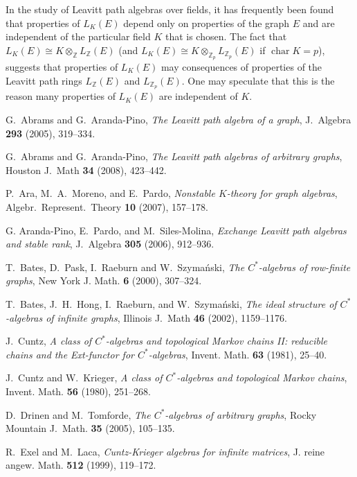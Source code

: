 \documentclass[11pt]{amsart}
\theoremstyle{remark}
\numberwithin{equation}{section}
\newcommand{\Z}{\mathbb{Z}}
\newcommand{\ch}{\operatorname{char}}
\begin{document}
In the study of Leavitt path algebras over fields, it has frequently been found that properties of $L_K(E)$ depend only on properties of the graph $E$ and are independent of the particular field $K$ that is chosen.  The fact that $L_K(E) \cong K \otimes_\Z L_\Z(E)$ (and $L_K(E) \cong K \otimes_{\Z_p} L_{\Z_p} (E)$ if $\ch K = p$), suggests that properties of $L_K(E)$ may consequences of properties of the Leavitt path rings $L_\Z(E)$ and $L_{\Z_p}(E)$.  One may speculate that this is the reason many properties of $L_K(E)$ are independent of $K$.


\begin{thebibliography}{99}

G.~Abrams and G.~Aranda-Pino, \emph{The Leavitt path algebra of a graph}, J.~Algebra \textbf{293} (2005), 319--334.

G.~Abrams and G.~Aranda-Pino, \emph{The Leavitt path algebras of arbitrary graphs}, Houston J.~Math \textbf{34} (2008), 423--442.

P.~Ara, M.~A.~Moreno, and E.~Pardo, \emph{Nonstable $K$-theory for graph algebras}, Algebr.~Represent.~Theory \textbf{10} (2007), 157--178. 

G. Aranda-Pino, E.~Pardo, and M.~Siles-Molina, \emph{Exchange Leavitt path algebras and stable rank}, J.~Algebra \textbf{305} (2006), 912--936.

T.~Bates, D.~Pask, I.~Raeburn and W.~Szyma\'nski,
\emph{The $C^*$-algebras of row-finite graphs}, New York J.
Math. \textbf{6} (2000), 307--324.

T.~Bates, J.~H.~Hong, I.~Raeburn, and W.~Szyma\'nski,
\emph{The ideal structure of $C^*$-algebras of infinite graphs},
Illinois J.~Math \textbf{46}  (2002), 1159--1176.

J.~Cuntz, \emph{A class of $C^*$-algebras and
topological Markov chains II: reducible chains and the
Ext-functor for $C^*$-algebras}, Invent. Math.
\textbf{63} (1981), 25--40.

J.~Cuntz and W.~Krieger, \emph{A class of $C^*$-algebras and
topological Markov chains}, Invent. Math. \textbf{56} (1980),
251--268.

D.~Drinen and M.~Tomforde, \emph{The $C^*$-algebras of
arbitrary graphs}, Rocky Mountain J.~Math. \textbf{35} (2005),
105--135.

R.~Exel and M.~Laca, \emph{Cuntz-Krieger algebras for
infinite matrices}, J. reine angew. Math. \textbf{512}
(1999), 119--172.


\end{thebibliography}
\end{document}
